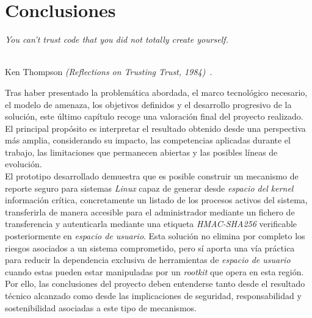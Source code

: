\chapter{Conclusiones}
\label{cap:capitulo6}

\begin{flushright}
\begin{minipage}[]{10cm}
\emph{\guillemotleft You can't trust code that you did not totally create yourself.\guillemotright}\\
\end{minipage}\\

Ken Thompson \textit{(Reflections on Trusting Trust, 1984)}~\cite{thompson_trusting_trust}.
\end{flushright}

\vspace{1cm}

Tras haber presentado la problemática abordada, el marco tecnológico necesario, el modelo de amenaza, los objetivos definidos y el desarrollo progresivo de la solución, este último capítulo recoge una valoración final del proyecto realizado.\\

El principal propósito es interpretar el resultado obtenido desde una perspectiva más amplia, considerando su impacto, las competencias aplicadas durante el trabajo, las limitaciones que permanecen abiertas y las posibles líneas de evolución.\\

El prototipo desarrollado demuestra que es posible construir un mecanismo de reporte seguro para sistemas \textit{Linux} capaz de generar desde \textit{espacio del kernel} información crítica, concretamente un listado de los procesos activos del sistema, transferirla de manera accesible para el administrador mediante un fichero de transferencia y autenticarla mediante una etiqueta \textit{HMAC-SHA256} verificable posteriormente en \textit{espacio de usuario}.
Esta solución no elimina por completo los riesgos asociados a un sistema comprometido, pero sí aporta una vía práctica para reducir la dependencia exclusiva de herramientas de \textit{espacio de usuario} cuando estas pueden estar manipuladas por un \textit{rootkit} que opera en esta región.
Por ello, las conclusiones del proyecto deben entenderse tanto desde el resultado técnico alcanzado como desde las implicaciones de seguridad, responsabilidad y sostenibilidad asociadas a este tipo de mecanismos.\\

